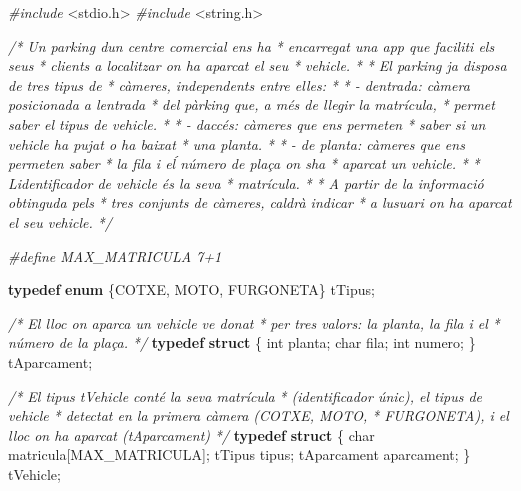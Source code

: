 \documentclass[
]{book}
\newenvironment{Shaded}{\begin{snugshade}}{\end{snugshade}}
\newcommand{\CommentTok}[1]{\textcolor[rgb]{0.56,0.35,0.01}{\textit{#1}}}
\newcommand{\DataTypeTok}[1]{\textcolor[rgb]{0.13,0.29,0.53}{#1}}
\newcommand{\ImportTok}[1]{#1}
\newcommand{\KeywordTok}[1]{\textcolor[rgb]{0.13,0.29,0.53}{\textbf{#1}}}
\newcommand{\NormalTok}[1]{#1}
\newcommand{\PreprocessorTok}[1]{\textcolor[rgb]{0.56,0.35,0.01}{\textit{#1}}}
\begin{document}
\begin{Shaded}
\begin{Highlighting}[]
\PreprocessorTok{\#include }\ImportTok{\textless{}stdio.h\textgreater{}}
\PreprocessorTok{\#include }\ImportTok{\textless{}string.h\textgreater{}}

\CommentTok{/* Un parking d\textquotesingle{}un centre comercial ens ha }
\CommentTok{ * encarregat una app que faciliti els seus}
\CommentTok{ * clients a localitzar on ha aparcat el seu}
\CommentTok{ * vehicle.}
\CommentTok{ * }
\CommentTok{ * El parking ja disposa de tres tipus de }
\CommentTok{ * càmeres, independents entre elles:}
\CommentTok{ * }
\CommentTok{ * {-} d\textquotesingle{}entrada: càmera posicionada a l\textquotesingle{}entrada}
\CommentTok{ *   del pàrking que, a més de llegir la matrícula,}
\CommentTok{ *   permet saber el tipus de vehicle.}
\CommentTok{ * }
\CommentTok{ * {-} d\textquotesingle{}accés: càmeres que ens permeten}
\CommentTok{ *   saber si un vehicle ha pujat o ha baixat}
\CommentTok{ *   una planta.}
\CommentTok{ * }
\CommentTok{ * {-} de planta: càmeres que ens permeten saber}
\CommentTok{ *   la fila i eĺ número de plaça on s\textquotesingle{}ha }
\CommentTok{ *   aparcat un vehicle.}
\CommentTok{ * }
\CommentTok{ * L\textquotesingle{}identificador de vehicle és la seva }
\CommentTok{ * matrícula.}
\CommentTok{ * }
\CommentTok{ * A partir de la informació obtinguda pels}
\CommentTok{ * tres conjunts de càmeres, caldrà indicar}
\CommentTok{ * a l\textquotesingle{}usuari on ha aparcat el seu vehicle.}
\CommentTok{ */}

\PreprocessorTok{\#define MAX\_MATRICULA 7+1}

\KeywordTok{typedef} \KeywordTok{enum}\NormalTok{ \{COTXE, MOTO, FURGONETA\} tTipus;}

\CommentTok{/* El lloc on aparca un vehicle ve donat}
\CommentTok{ * per tres valors: la planta, la fila i el }
\CommentTok{ * número de la plaça.}
\CommentTok{ */}
\KeywordTok{typedef} \KeywordTok{struct}\NormalTok{ \{}
    \DataTypeTok{int}\NormalTok{ planta;}
    \DataTypeTok{char}\NormalTok{ fila;}
    \DataTypeTok{int}\NormalTok{ numero;}
\NormalTok{\} tAparcament;}

\CommentTok{/* El tipus tVehicle conté la seva matrícula}
\CommentTok{ * (identificador únic), el tipus de vehicle}
\CommentTok{ * detectat en la primera càmera (COTXE, MOTO,}
\CommentTok{ * FURGONETA), i el lloc on ha aparcat (tAparcament)}
\CommentTok{ */}
\KeywordTok{typedef} \KeywordTok{struct}\NormalTok{ \{}
    \DataTypeTok{char}\NormalTok{ matricula[MAX\_MATRICULA];}
\NormalTok{    tTipus tipus;}
\NormalTok{    tAparcament aparcament;}
\NormalTok{\} tVehicle;}


\end{Highlighting}
\end{Shaded}
\end{document}
